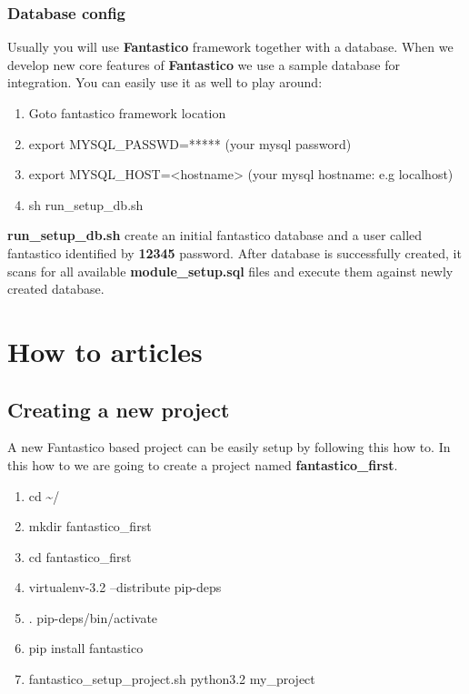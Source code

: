 \documentclass[letterpaper,10pt,english]{sphinxmanual}
\begin{document}
\subsection{Database config}
\label{get_started/dev_mode:database-config}
Usually you will use \textbf{Fantastico} framework together with a database. When we develop new core features of \textbf{Fantastico}
we use a sample database for integration. You can easily use it as well to play around:
\begin{enumerate}
\item {} 
Goto fantastico framework location

\item {} 
export MYSQL\_PASSWD=***** (your mysql password)

\item {} 
export MYSQL\_HOST=\textless{}hostname\textgreater{} (your mysql hostname: e.g localhost)

\item {} 
sh run\_setup\_db.sh

\end{enumerate}

\textbf{run\_setup\_db.sh} create an initial fantastico database and a user called fantastico identified by \textbf{12345} password. After
database is successfully created, it scans for all available \textbf{module\_setup.sql} files and execute them against newly created
database.


\chapter{How to articles}
\label{how_to/how_to:how-to-articles}\label{how_to/how_to::doc}

\section{Creating a new project}
\label{how_to/new_project_how_to:creating-a-new-project}\label{how_to/new_project_how_to::doc}
A new Fantastico based project can be easily setup by following this how to. In this how to we are going to create
a project named \textbf{fantastico\_first}.
\begin{enumerate}
\item {} 
cd \textasciitilde{}/

\item {} 
mkdir fantastico\_first

\item {} 
cd fantastico\_first

\item {} 
virtualenv-3.2 --distribute pip-deps

\item {} 
. pip-deps/bin/activate

\item {} 
pip install fantastico

\item {} 
fantastico\_setup\_project.sh python3.2 my\_project

\end{enumerate}
\end{document}
